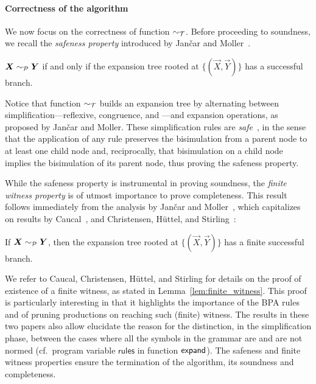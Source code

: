 \paragraph{Correctness of the algorithm}

We now focus on the correctness of function $\sim_\mathcal T$.  Before
proceeding to soundness, we recall the \emph{safeness property}
introduced by Jan{\v{c}}ar and Moller~\cite{janvcar1999techniques}.

\begin{lemma} 
  \label{lem:safeness}
  $\vec X \ProdEquiv \vec Y$ if and only if the expansion tree rooted
  at $\{(\vec X, \vec Y)\}$ has a successful branch.
\end{lemma}

Notice that function $\sim_\mathcal T$ builds an expansion tree by alternating
between simplification---reflexive, congruence, and \BPA---and
expansion operations, as proposed by Jan{\v{c}}ar and Moller.
%
These simplification rules are
\emph{safe}~\cite{janvcar1999techniques}, in the sense that the
application of any rule preserves the bisimulation from a parent node
to at least one child node and, reciprocally, that bisimulation on a
child node implies the bisimulation of its parent node, thus proving
the safeness property.

While the safeness property is instrumental in proving
soundness, the \emph{finite witness property} is of
utmost importance to prove completeness. This result follows
immediately from the analysis by Jan{\v{c}}ar and
Moller~\cite{janvcar1999techniques}, which capitalizes on results by
Caucal~\cite{caucal1986decidabilite}, and Christensen, H{\"{u}}ttel, and
Stirling~\cite{DBLP:journals/iandc/ChristensenHS95}:

\begin{lemma} 
\label{lem:finite_witness}
	If $\vec X \ProdEquiv \vec Y$, then the expansion tree rooted at
	$\{(\vec X, \vec Y)\}$ has a finite successful branch.
\end{lemma}

We refer to Caucal, Christensen, H{\"{u}}ttel, and Stirling for
details on the proof of existence of a finite witness, as stated in
Lemma~\ref{lem:finite_witness}. This proof is particularly interesting in
that it highlights the importance of the BPA rules and of pruning
productions on reaching such (finite) witness. The results in these
two papers also allow elucidate the reason for the distinction, in
the simplification phase, between the cases where all the symbols in
the grammar are and are not normed (cf.~program variable
$\mathsf{rules}$ in function $\mathsf{expand}$).
%
The safeness and finite witness properties ensure the termination of
the algorithm, its soundness and completeness.

